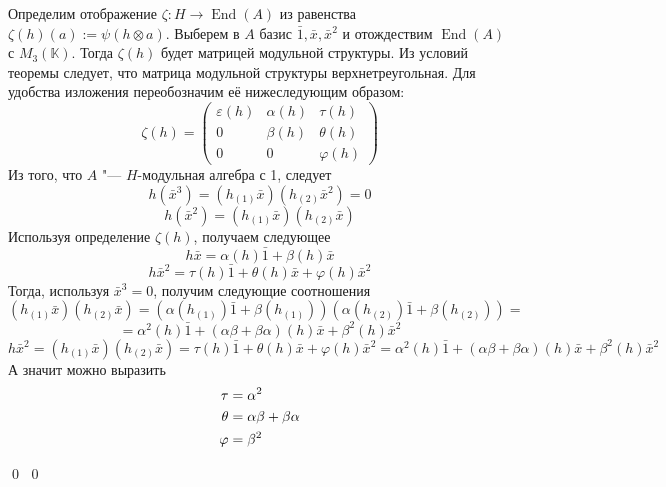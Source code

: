 \documentclass[12pt, reqno, a4paper, oneside, notitlepage]{amsart}
\makeatletter
\theoremstyle{mytheoremstyle}
\theoremstyle{myremarkstyle}
\numberwithin{equation}{section}
\renewenvironment{proof}[1][\proofname]{\par\indent {\bfseries #1\@addpunct{.} }}{\qed}
\DeclareMathOperator{\End}{End}
\makeatother
\begin{document}
\begin{proof}
\begin{proof}
    Определим отображение $\zeta:H \to \End(A)$ из равенства $\zeta(h)(a) := \psi(h \otimes a)$.
    Выберем в $A$ базис $\bar 1, \bar x, \bar x^2$ и отождествим $\End(A)$ с $M_3(\mathbb{K})$. Тогда $\zeta(h)$ будет матрицей модульной структуры. Из условий теоремы следует, что матрица модульной структуры верхнетреугольная.
    Для удобства изложения переобозначим её нижеследующим образом: \[
    \zeta(h) = 
    \begin{pmatrix}
        \varepsilon(h) & \alpha(h) & \tau(h)\\
         0 & \beta(h) & \theta(h) \\
         0 & 0 & \varphi(h)
    \end{pmatrix}    
    \]
    Из того, что $A$ "--- $H$-модульная алгебра с 1, следует 
    $$h(\bar{x}^3)=(h_{(1)}\bar{x})(h_{(2)}\bar{x}^2) = 0 $$ 
    $$h(\bar{x}^2)=(h_{(1)}\bar{x})(h_{(2)}\bar{x})$$
    Используя определение $\zeta(h)$, получаем следующее
    $$h\bar x= \alpha(h)\bar1 + \beta(h) \bar x$$
    $$h\bar x^2 = \tau(h)\bar1 + \theta(h) \bar x + \varphi(h) \bar x^2$$
    Тогда, используя $\bar x^3 = 0$, получим следующие соотношения
    \[
    (h_{(1)}\bar{x})(h_{(2)}\bar{x}) = \left( \alpha(h_{(1)}) \bar{1} + \beta(h_{(1)}) \right)
    \left( \alpha(h_{(2)}) \bar{1} + \beta(h_{(2)}) \right)=
    \]
    \[
     = \alpha^2(h)\bar{1} + (\alpha\beta + \beta\alpha)(h) \bar{x} + \beta^2(h) \bar{x}^2
    \]
    $$h\bar x^2 = (h_{(1)}\bar{x})(h_{(2)}\bar{x}) = \tau(h)\bar1 + \theta(h) \bar x + \varphi(h) \bar x^2 = \alpha^2(h)\bar{1} + (\alpha\beta + \beta\alpha)(h) \bar{x} + \beta^2(h) \bar{x}^2$$
    А значит можно выразить  
    \begin{align} \label{repl}
        \tau &= \alpha^2 \notag \\
        \theta &= \alpha\beta+\beta\alpha \\
        \varphi &=\beta^2 \notag
    \end{align}


\end{proof}
\end{proof}
\end{document}
